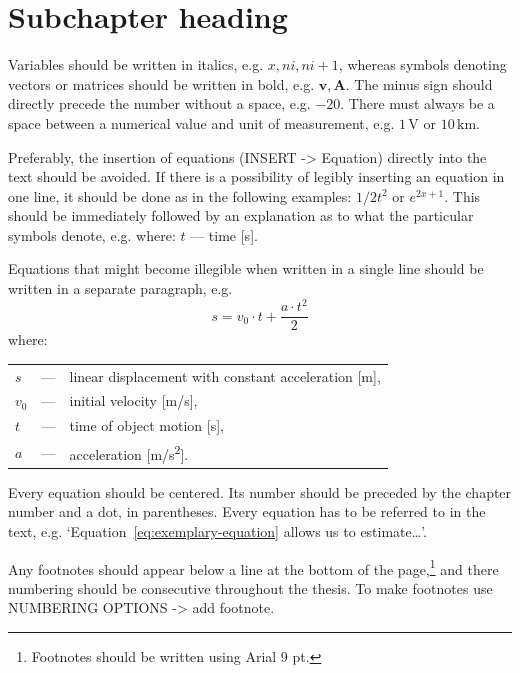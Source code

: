 \section{Subchapter heading}

Variables should be written in italics, e.g. $x, ni, ni+1$, whereas symbols denoting vectors or matrices should be written in bold, e.g. $\mathbf{v}, \mathbf{A}$. The minus sign should directly precede the number without a space, e.g. $-20$. There must always be a space between a numerical value and unit of measurement, e.g. $1\,\mathrm{V}$ or $10\,\mathrm{km}$.

Preferably, the insertion of equations (INSERT -\textgreater{} Equation) directly into the text should be avoided. If there is a possibility of legibly inserting an equation in one line, it should be done as in the following examples: $1/2t^2$ or $e^{2x+1}$. This should be immediately followed by an explanation as to what the particular symbols denote, e.g. where: $t$ --– time [s].

Equations that might become illegible when written in a single line should be written in a separate paragraph, e.g.
\begin{equation}
	\label{eq:exemplary-equation}
	s = v_0 \cdot t + \frac{a \cdot t^2}{2}
\end{equation}
where: \\
\begin{tabularx}{\textwidth}{p{1.25cm}p{0.5cm}X}
	$s$		& ---	& linear displacement with constant acceleration [m], \\
	$v_0$ 	& ---	& initial velocity [m/s], \\
	$t$		& ---	& time of object motion [s], \\
	$a$		& ---	& acceleration [m/s\textsuperscript{2}].
\end{tabularx}

Every equation should be centered. Its number should be preceded by the chapter number and a dot, in parentheses. Every equation has to be referred to in the text, e.g. `Equation~\eqref{eq:exemplary-equation} allows us to estimate\ldots'.

Any footnotes should appear below a line at the bottom of the page,\footnote{Footnotes should be written using Arial 9 pt.} and there numbering should be consecutive throughout the thesis. To make footnotes use NUMBERING OPTIONS -\textgreater{} add footnote.